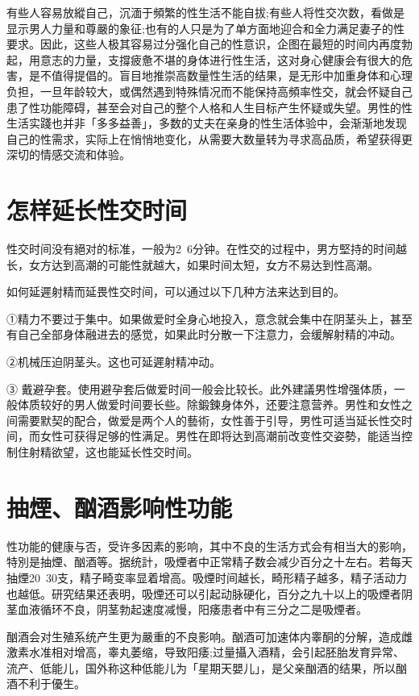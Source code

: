 \documentclass[12pt,UTF8]{ctexbook}
\begin{document}
有些人容易放縱自己，沉湎于頻繁的性生活不能自拔;有些人将性交次数，看做是显示男人力量和尊嚴的象征;也有的人只是为了单方面地迎合和全力满足妻子的性要求。因此，这些人极其容易过分强化自己的性意识，企图在最短的时间内再度勃起，用意志的力量，支撐疲惫不堪的身体进行性生活，这对身心健康会有很大的危害，是不值得提倡的。盲目地推崇高数量性生活的结果，是无形中加重身体和心理负担，一旦年龄较大，或偶然遇到特殊情况而不能保持高頻率性交，就会怀疑自己患了性功能障碍，甚至会对自己的整个人格和人生目标产生怀疑或失望。男性的性生活实踐也并非「多多益善」，多数的丈夫在亲身的性生活体验中，会渐渐地发现自己的性需求，实际上在悄悄地变化，从需要大数量转为寻求高品质，希望获得更深切的情感交流和体验。

\section{怎样延长性交时间}

性交时间没有絕对的标准，一般为2~6分钟。在性交的过程中，男方堅持的时间越长，女方达到高潮的可能性就越大，如果时间太短，女方不易达到性高潮。

如何延遲射精而延畏性交时间，可以通过以下几种方法来达到目的。

①精力不要过于集中。如果做爱时全身心地投入，意念就会集中在阴茎头上，甚至有自己全部身体融进去的感觉，如果此时分散一下注意力，会缓解射精的冲动。

②机械压迫阴茎头。这也可延遲射精冲动。

③ 戴避孕套。使用避孕套后做爱时间一般会比较长。此外建議男性增强体质，一般体质较好的男人做爱时间要长些。除鍛鍊身体外，还要注意营养。男性和女性之间需要默契的配合，做爱是两个人的藝術，女性善于引导，男性可适当延长性交时间，而女性可获得足够的性满足。男性在即将达到高潮前改变性交姿勢，能适当控制住射精欲望，这也能延长性交时间。

\section{抽煙、酗酒影响性功能}

性功能的健康与否，受许多因素的影响，其中不良的生活方式会有相当大的影响，特別是抽煙、酗酒等。据统計，吸煙者中正常精子数会减少百分之十左右。若每天抽煙20~30支，精子畸变率显着增高。吸煙时间越长，畸形精子越多，精子活动力也越低。研究结果还表明，吸煙还可以引起动脉硬化，百分之九十以上的吸煙者阴茎血液循环不良，阴茎勃起速度减慢，阳痿患者中有三分之二是吸煙者。

酗酒会对生殖系统产生更为嚴重的不良影响。酗酒可加速体内睾酮的分解，造成雌激素水准相对增高，睾丸萎缩，导致阳痿;过量攝入酒精，会引起胚胎发育异常、流产、低能儿，国外称这种低能儿为「星期天嬰儿」，是父亲酗酒的结果，所以酗酒不利于優生。
\end{document}
